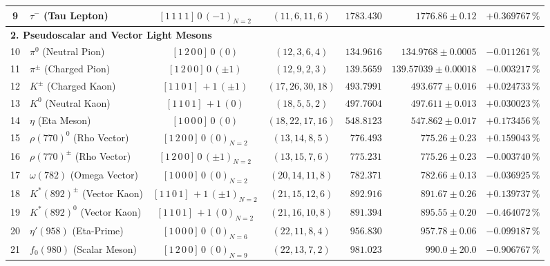 \documentclass[
    12pt,
    a4paper,
    headings=normal,
    twoside=false,
    open=any,
    parskip=half
]{scrbook}
\begin{document}
\begin{longtable}{clccrrr}
\rowcolor{secondarycolor!8}
9 & $\tau^-$ (Tau Lepton) & $[1 \, 1 \, 1 \, 1] \, 0 \, (-1)_{N=2}$ & $(11, 6, 11, 6)$ & $1783.430$ & $1776.86 \pm 0.12$ & $+0.369767\,\%$ \\\midrule
\multicolumn{7}{l}{\textsf{\textbf{\color{maincolor!90!black}2. Pseudoscalar and Vector Light Mesons}}} \\\midrule
\rowcolor{secondarycolor!8}
10 & $\pi^0$ (Neutral Pion) & $[1 \, 2 \, 0 \, 0] \, 0 \, (0)$ & $(12, 3, 6, 4)$ & $134.9616$ & $134.9768 \pm 0.0005$ & $-0.011261\,\%$ \\
\rowcolor{secondarycolor!8}
11 & $\pi^\pm$ (Charged Pion) & $[1 \, 2 \, 0 \, 0] \, 0 \, (\pm 1)$ & $(12, 9, 2, 3)$ & $139.5659$ & $139.57039 \pm 0.00018$ & $-0.003217\,\%$ \\
\rowcolor{secondarycolor!8}
12 & $K^\pm$ (Charged Kaon) & $[1 \, 1 \, 0 \, 1] \, +1 \, (\pm 1)$ & $(17, 26, 30, 18)$ & $493.7991$ & $493.677 \pm 0.016$ & $+0.024733\,\%$ \\
\rowcolor{secondarycolor!8}
13 & $K^0$ (Neutral Kaon) & $[1 \, 1 \, 0 \, 1] \, +1 \, (0)$ & $(18, 5, 5, 2)$ & $497.7604$ & $497.611 \pm 0.013$ & $+0.030023\,\%$ \\
\rowcolor{secondarycolor!8}
14 & $\eta$ (Eta Meson) & $[1 \, 0 \, 0 \, 0] \, 0 \, (0)$ & $(18, 22, 17, 16)$ & $548.8123$ & $547.862 \pm 0.017$ & $+0.173456\,\%$ \\
15 & $\rho(770)^0$ (Rho Vector) & $[1 \, 2 \, 0 \, 0] \, 0 \, (0)_{N=2}$ & $(13, 14, 8, 5)$ & $776.493$ & $775.26 \pm 0.23$ & $+0.159043\,\%$ \\
16 & $\rho(770)^\pm$ (Rho Vector) & $[1 \, 2 \, 0 \, 0] \, 0 \, (\pm 1)_{N=2}$ & $(13, 15, 7, 6)$ & $775.231$ & $775.26 \pm 0.23$ & $-0.003740\,\%$ \\
17 & $\omega(782)$ (Omega Vector) & $[1 \, 0 \, 0 \, 0] \, 0 \, (0)_{N=2}$ & $(20, 14, 11, 8)$ & $782.371$ & $782.66 \pm 0.13$ & $-0.036925\,\%$ \\
18 & $K^*(892)^\pm$ (Vector Kaon) & $[1 \, 1 \, 0 \, 1] \, +1 \, (\pm 1)_{N=2}$ & $(21, 15, 12, 6)$ & $892.916$ & $891.67 \pm 0.26$ & $+0.139737\,\%$ \\
19 & $K^*(892)^0$ (Vector Kaon) & $[1 \, 1 \, 0 \, 1] \, +1 \, (0)_{N=2}$ & $(21, 16, 10, 8)$ & $891.394$ & $895.55 \pm 0.20$ & $-0.464072\,\%$ \\
20 & $\eta'(958)$ (Eta-Prime) & $[1 \, 0 \, 0 \, 0] \, 0 \, (0)_{N=6}$ & $(22, 11, 8, 4)$ & $956.830$ & $957.78 \pm 0.06$ & $-0.099187\,\%$ \\
21 & $f_0(980)$ (Scalar Meson) & $[1 \, 2 \, 0 \, 0] \, 0 \, (0)_{N=9}$ & $(22, 13, 7, 2)$ & $981.023$ & $990.0 \pm 20.0$ & $-0.906767\,\%$ \\

\end{longtable}
\end{document}
